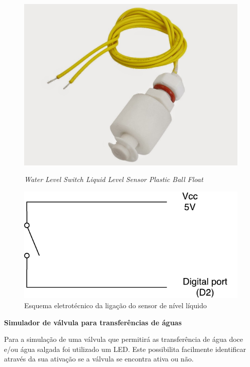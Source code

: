 \begin{figure}[h]
	\centering
	\begin{minipage}[b]{0.4\textwidth}
		\centering
		\includegraphics[width=\textwidth]{img/hardware/liquido.JPG}
		\caption{\textit{Water Level Switch Liquid Level Sensor Plastic Ball Float}}
	\end{minipage}
	\hfill
	\begin{minipage}[b]{0.4\textwidth}
		\centering
		\includegraphics[width=\textwidth]{img/hardware/sw_esquema.pdf}
		\caption{Esquema eletrotécnico da ligação do sensor de nível líquido}
		\label{esquem-liquido}
	\end{minipage}
\end{figure}



\textbf{Simulador de válvula para transferências de águas}

Para a simulação de uma válvula que permitirá as transferência de água doce e/ou água salgada foi utilizado um \ac{LED}. Este possibilita facilmente identificar através da sua ativação se a válvula se encontra ativa ou não. 


